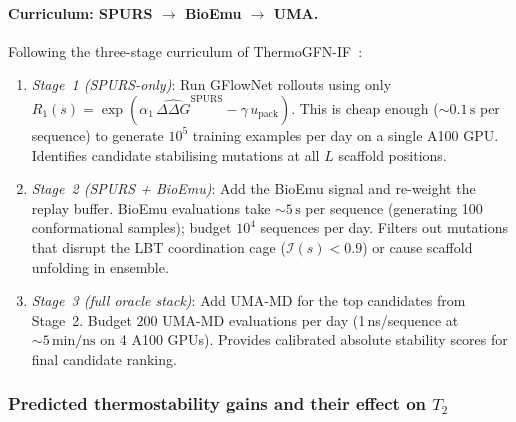 \documentclass[11pt,oneside]{amsbook}
\numberwithin{equation}{section}
\theoremstyle{plain}
\theoremstyle{definition}
\theoremstyle{remark}
\begin{document}
\paragraph{Curriculum: SPURS $\to$ BioEmu $\to$ UMA.}
Following the three-stage curriculum of ThermoGFN-IF~\cite{SchreiberThermoGFN2025}:
\begin{enumerate}[label=\rm(\roman*)]
\item \emph{Stage~1 (SPURS-only)}: Run GFlowNet rollouts using only $R_1(s)
  = \exp(\alpha_1\,\widehat{\Delta\Delta G}^{\mathrm{SPURS}} - \gamma\,u_{\mathrm{pack}})$.
  This is cheap enough ($\sim 0.1\,\text{s}$ per sequence) to generate
  $10^5$ training examples per day on a single A100 GPU.
  Identifies candidate stabilising mutations at all $L$ scaffold positions.
\item \emph{Stage~2 (SPURS + BioEmu)}: Add the BioEmu signal and re-weight
  the replay buffer.  BioEmu evaluations take $\sim 5\,\text{s}$ per sequence
  (generating 100 conformational samples); budget $10^4$ sequences per day.
  Filters out mutations that disrupt the LBT coordination cage
  ($\mathcal{I}(s) < 0.9$) or cause scaffold unfolding in ensemble.
\item \emph{Stage~3 (full oracle stack)}: Add UMA-MD for the top candidates
  from Stage~2.  Budget $200$ UMA-MD evaluations per day (1\,ns/sequence at
  $\sim 5\,\text{min}/\text{ns}$ on 4 A100 GPUs).  Provides calibrated
  absolute stability scores for final candidate ranking.
\end{enumerate}

\subsubsection{Predicted thermostability gains and their effect on $T_2$}
\end{document}
